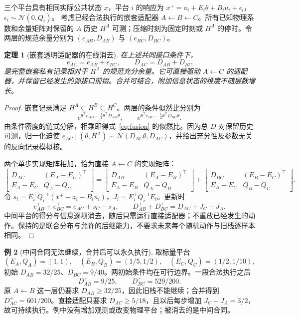 \documentclass[UTF8,fontset=fandol,11pt,a4paper]{ctexart}
\newcommand{\N}{\mathcal N}
\newcommand{\E}{\mathbb E}
\newtheorem{theorem}{定理}[section]
\theoremstyle{definition}
\newtheorem{example}[theorem]{例}
\theoremstyle{remark}
\numberwithin{equation}{section}
\begin{document}
三个平台具有相同实际公共状态 $x$，平台 $i$ 的响应为
$x^+=a_i+E_i\theta+B_i u_i+\epsilon_i$，$\epsilon_i\sim\N(0,Q_i)$。
考虑已经合法执行的嵌套适配器 $A\leftarrow B\leftarrow C$。所有已知物理系数和余量矩阵对保留的 $A$ 历史 $H^A$ 可测；压缩时刻为固定时刻或 $H^A$ 的停时。令两层的规范余量分别为 $(e_{AB},D_{AB})$ 与 $(e_{BC},D_{BC})$。

\begin{theorem}[嵌套透明适配器的在线消去]
在上述共同接口条件下，
\begin{equation}
 e_{AC}=e_{AB}+e_{BC},\qquad D_{AC}=D_{AB}+D_{BC}
 \label{eq:fusion}
\end{equation}
是完整嵌套私有记录相对于 $H^A$ 的规范充分余量。它可直接驱动 $A\leftarrow C$ 的适配器，并保留已经发生的源接口前缀。合并可结合，附加信息状态的维度不随层数增长。
\end{theorem}

\begin{proof}
嵌套记录满足 $H^A\subseteq H^B\subseteq H^C$。两层的条件似然比分别为
\[
 e^{\theta^\top e_{AB}-\frac12\theta^\top D_{AB}\theta},\qquad
 e^{\theta^\top e_{BC}-\frac12\theta^\top D_{BC}\theta}.
\]
由条件密度的链式分解，相乘即得式~\eqref{eq:fusion} 的似然比。因为总 $D$ 对保留历史可测，归一化迫使 $e_{AC}\mid(\theta,H^A)\sim\N(D_{AC}\theta,D_{AC})$，并给出充分性及参数无关的反向记录模拟核。

两个单步实现矩阵相加，恰为直接 $A\leftarrow C$ 的实现矩阵：
\[
 \begin{bmatrix}D_{AC}&(E_A-E_C)^\top\\E_A-E_C&Q_A-Q_C\end{bmatrix}
 =\begin{bmatrix}D_{AB}&(E_A-E_B)^\top\\E_A-E_B&Q_A-Q_B\end{bmatrix}
 +\begin{bmatrix}D_{BC}&(E_B-E_C)^\top\\E_B-E_C&Q_B-Q_C\end{bmatrix}.
\]
令 $s_i=E_i^\top Q_i^{-1}(x^+-a_i-B_i u_i)$，$J_i=E_i^\top Q_i^{-1}E_i$。更新时
\[
 e_{AB}^++e_{BC}^+=e_{AC}+s_C-s_A,\qquad
 D_{AB}^++D_{BC}^+=D_{AC}+J_C-J_A.
\]
中间平台的得分与信息逐项消去，随后只需运行直接适配器；不重放已经发生的动作。保持的是联合分布与允许的后继能力，不要求未来每个随机动作与旧栈逐样本相同。
\end{proof}

\begin{example}[中间合同无法继续，合并后可以永久执行]
取标量平台
\[
 (E_A,Q_A)=(1,1),\quad(E_B,Q_B)=(1/5,1/2),\quad(E_C,Q_C)=(1/2,1/10),
\]
初始 $D_{AB}=32/25$、$D_{BC}=9/40$。两初始条件均在可行边界。一段合法执行之后
\[
 D_{AB}^+=9/25,\qquad D_{BC}^+=529/200.
\]
原 $A\leftarrow B$ 这一层仍要求 $D_{AB}\ge32/25$，因此旧栈不能继续；合并得到 $D_{AC}^+=601/200$。直接适配只要求 $D_{AC}\ge5/18$，且以后每步增加 $J_C-J_A=3/2$，故可持续执行。例中没有增加观测或改变物理平台；被消去的是中间合同。
\end{example}
\end{document}
